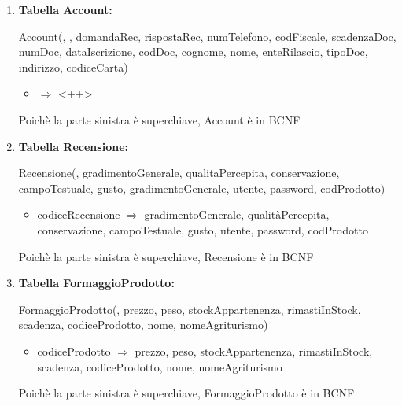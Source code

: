 \documentclass[12pt,a4paper]{article}
\begin{document}
\begin{enumerate}
\item[] \textbf{Tabella Account:}

Account(\underline{}, \underline{}, domandaRec, rispostaRec, numTelefono, codFiscale, scadenzaDoc, numDoc, dataIscrizione, codDoc, cognome, nome, enteRilascio, tipoDoc, indirizzo, codiceCarta)
\begin{itemize}
\vspace{-5pt}
\item <++> $\Rightarrow$ <++>
\vspace{-5pt}
\end{itemize}
Poichè la parte sinistra è superchiave, Account è in BCNF
\vspace{10pt}



\item[] \textbf{Tabella Recensione:}

Recensione(\underline{}, gradimentoGenerale, qualitaPercepita, conservazione, campoTestuale, gusto, gradimentoGenerale,  utente,  password,  codProdotto)
\begin{itemize}
\vspace{-5pt}
\item codiceRecensione $\Rightarrow$ gradimentoGenerale, qualitàPercepita, conservazione, campoTestuale, gusto, utente, password, codProdotto
\vspace{-5pt}
\end{itemize}
Poichè la parte sinistra è superchiave, Recensione è in BCNF
\vspace{10pt}



\item[] \textbf{Tabella FormaggioProdotto:}

FormaggioProdotto(\underline{}, prezzo, peso, stockAppartenenza, rimastiInStock, scadenza,  codiceProdotto,  nome,  nomeAgriturismo)
\begin{itemize}
\vspace{-5pt}
\item codiceProdotto $\Rightarrow$ prezzo, peso, stockAppartenenza, rimastiInStock, scadenza, codiceProdotto, nome, nomeAgriturismo
\vspace{-5pt}
\end{itemize}
Poichè la parte sinistra è superchiave, FormaggioProdotto è in BCNF
\vspace{10pt}




\end{enumerate}
\end{document}
